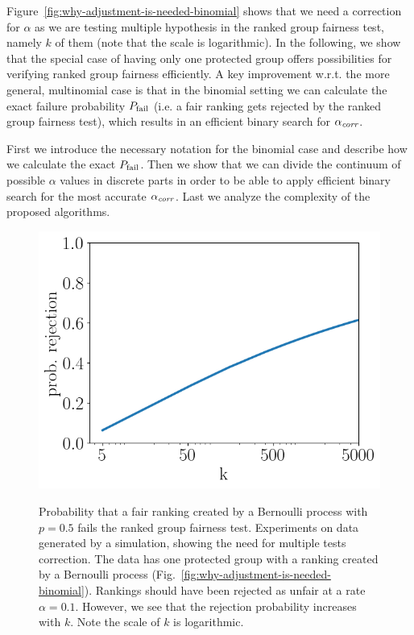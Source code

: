 Figure~\ref{fig:why-adjustment-is-needed-binomial} shows that we need a correction for $\alpha$ as we are testing multiple hypothesis in the ranked group fairness test, namely $k$ of them (note that the scale is logarithmic).
%
In the following, we show that the special case of having only one protected group offers possibilities for verifying ranked group fairness efficiently.
%
A key improvement w.r.t. the more general, multinomial case is that in the binomial setting we can calculate the exact failure probability $P_{\operatorname{fail}}$ (i.e. a fair ranking gets rejected by the ranked group fairness test), which results in an efficient binary search for $\alpha_\textit{corr}$.
%

First we introduce the necessary notation for the binomial case and describe how we calculate the exact $P_{\operatorname{fail}}$.
%
Then we show that we can divide the continuum of possible $\alpha$ values in discrete parts in order to be able to apply efficient binary search for the most accurate $\alpha_\textit{corr}$.
%
Last we analyze the complexity of the proposed algorithms.
%
\begin{figure}[t!]
	\centering
	{\includegraphics[width=.48\textwidth]{pics/failProbPlotBinom.png}}
	\caption{
		Probability that a fair ranking created by a Bernoulli process with $p=0.5$ fails the ranked group fairness test.\label{fig:why-adjustment-is-needed-binomial}
		Experiments on data generated by a simulation, showing the need for multiple tests correction.
		The data has one protected group with a ranking created by  a Bernoulli process (Fig.~\ref{fig:why-adjustment-is-needed-binomial}).
		Rankings should have been rejected as unfair at a rate $\alpha = 0.1$.
		However, we see that the rejection probability increases with $k$.
		Note the scale of $k$ is logarithmic.}
	\label{fig:need-for-model-adjustment}
\end{figure}

